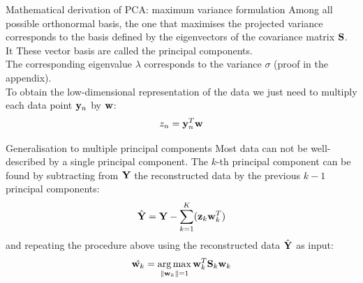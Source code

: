 \documentclass[aspectratio=169,notes]{beamer}
\newcommand\blfootnote[1]{%
  \begingroup
  \renewcommand\thefootnote{}\footnote{#1}%
  \addtocounter{footnote}{-1}%
  \endgroup
}
\begin{document}
	\begin{frame}{Mathematical derivation of PCA: maximum variance formulation}
	Among all possible orthonormal basis, the one that maximises the projected variance corresponds to the basis defined by the eigenvectors of the covariance matrix ${\bf S}$. It These vector basis are called the principal components.\\
	\leavevmode\newline
	The corresponding eigenvalue $\lambda$ corresponds to the variance $\sigma$ (proof in the appendix).\\
	\leavevmode\newline
	To obtain the low-dimensional representation of the data we just need to multiply each data point ${\bf y}_n$ by ${\bf w}$:
	\[
		z_n = {\bf y}_n^T {\bf w} 
	\]
	\end{frame}





	\begin{frame}{Generalisation to multiple principal components}
	Most data can not be well-described by a single principal component. The $k$-th principal component can be found by subtracting from ${\bf Y}$ the reconstructed data by the previous $k-1$ principal components: 
	\[
		\hat{{\bf Y}} = {\bf Y} - \sum_{k=1}^{K} ({\bf z}_k {\bf w}_k^T)
	\]
	and repeating the procedure above using the reconstructed data $\hat{{\bf Y}}$ as input:
	\[
		\hat{{\bf w}_k} = \operatorname*{arg\,max}_{\|{\bf w}_k\|=1} {\bf w}_{k}^{T} {\bf S}_k {\bf w}_k
	\]
	\end{frame}
\end{document}
